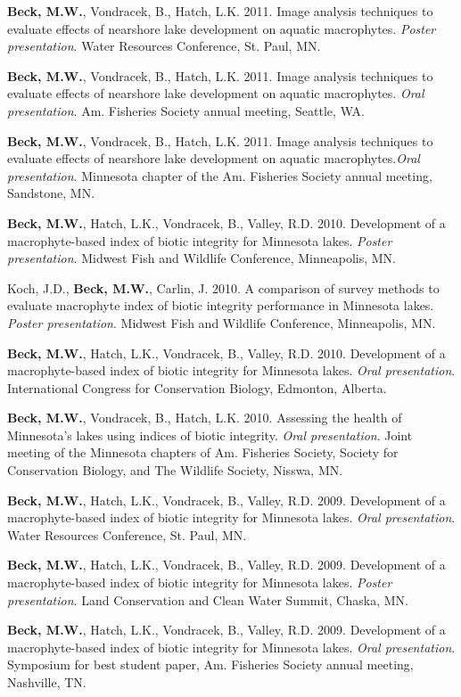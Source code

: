 \documentclass[letterpaper,12pt]{article}
\begin{document}
{\bf Beck, M.W.}, Vondracek, B., Hatch, L.K. 2011. Image analysis techniques to evaluate effects of nearshore lake development on aquatic macrophytes. \textit{Poster presentation}. Water Resources Conference, St. Paul, MN.

{\bf Beck, M.W.}, Vondracek, B., Hatch, L.K. 2011. Image analysis techniques to evaluate effects of nearshore lake development on aquatic macrophytes. \textit{Oral presentation}. Am. Fisheries Society annual meeting, Seattle, WA.

{\bf Beck, M.W.}, Vondracek, B., Hatch, L.K. 2011. Image analysis techniques to evaluate effects of nearshore lake development on aquatic macrophytes.\textit{Oral presentation}. Minnesota chapter of the Am. Fisheries Society annual meeting, Sandstone, MN.

{\bf Beck, M.W.}, Hatch, L.K., Vondracek, B., Valley, R.D. 2010. Development of a macrophyte-based index of biotic integrity for Minnesota lakes. \textit{Poster presentation}. Midwest Fish and Wildlife Conference, Minneapolis, MN.

Koch, J.D., {\bf Beck, M.W.}, Carlin, J. 2010. A comparison of survey methods to evaluate macrophyte index of biotic integrity performance in Minnesota lakes. \textit{Poster presentation}. Midwest Fish and Wildlife Conference, Minneapolis, MN.

{\bf Beck, M.W.}, Hatch, L.K., Vondracek, B., Valley, R.D. 2010. Development of a macrophyte-based index of biotic integrity for Minnesota lakes. \textit{Oral presentation}. International Congress for Conservation Biology, Edmonton, Alberta.

{\bf Beck, M.W.}, Vondracek, B., Hatch, L.K. 2010. Assessing the health of Minnesota's lakes using indices of biotic integrity. \textit{Oral presentation}. Joint meeting of the Minnesota chapters of Am. Fisheries Society, Society for Conservation Biology, and The Wildlife Society, Nisswa, MN.

{\bf Beck, M.W.}, Hatch, L.K., Vondracek, B., Valley, R.D. 2009. Development of a macrophyte-based index of biotic integrity for Minnesota lakes. \textit{Oral presentation}. Water Resources Conference, St. Paul, MN.

{\bf Beck, M.W.}, Hatch, L.K., Vondracek, B., Valley, R.D. 2009. Development of a macrophyte-based index of biotic integrity for Minnesota lakes. \textit{Poster presentation}. Land Conservation and Clean Water Summit, Chaska, MN.

{\bf Beck, M.W.}, Hatch, L.K., Vondracek, B., Valley, R.D. 2009. Development of a macrophyte-based index of biotic integrity for Minnesota lakes. \textit{Oral presentation}. Symposium for best student paper, Am. Fisheries Society annual meeting, Nashville, TN.
\end{document}
